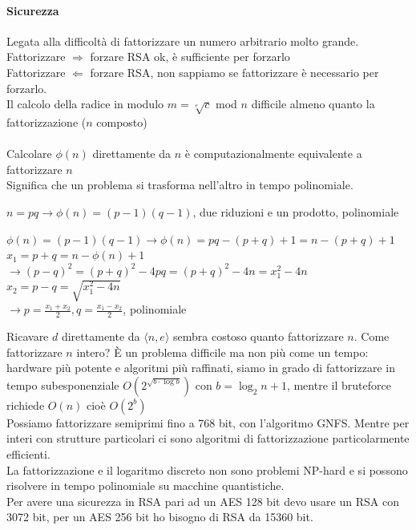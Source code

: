 \documentclass[10pt]{book}
\begin{document}
\paragraph{Sicurezza} Legata alla difficoltà di fattorizzare un numero arbitrario molto grande.\\
Fattorizzare $\Rightarrow$ forzare RSA ok, è sufficiente per forzarlo\\
Fattorizzare $\Leftarrow$ forzare RSA, non sappiamo se fattorizzare è necessario per forzarlo.\\
Il calcolo della radice in modulo $m = \sqrt[e]{c}$ mod $n$ difficile almeno quanto la fattorizzazione ($n$ composto)\\\\
Calcolare $\phi(n)$ direttamente da $n$ è computazionalmente equivalente a fattorizzare $n$\\Significa che un problema si trasforma nell'altro in tempo polinomiale.
\begin{list}{}{}
	\item $n = pq \longrightarrow \phi(n) = (p-1)(q-1)$, due riduzioni e un prodotto, polinomiale
	\item $\phi(n) = (p-1)(q-1) \rightarrow \phi(n) = pq - (p + q) + 1 = n - (p + q) + 1$\\$x_1 = p + q = n - \phi(n) + 1$\\
	$\rightarrow (p - q)^2 = (p + q)^2 - 4pq = (p+q)^2 -4n = x_1^2 - 4n$\\$x_2 = p - q = \sqrt{x_1^2 - 4n}$\\
	$\rightarrow p = \frac{x_1 + x_2}{2}, q = \frac{x_1 - x_2}{2}$, polinomiale
\end{list}
Ricavare $d$ direttamente da $\langle n, e\rangle$ sembra costoso quanto fattorizzare $n$. Come fattorizzare $n$ intero? È un problema difficile ma non più come un tempo: hardware più potente e algoritmi più raffinati, siamo in grado di fattorizzare in tempo subesponenziale $O(2^{\sqrt{b\cdot\log b}})$ con $b = \log_2 n + 1$, mentre il bruteforce richiede $O(n)$ cioè $O(2^b)$\\
Possiamo fattorizzare semiprimi fino a 768 bit, con l'algoritmo GNFS. Mentre per interi con strutture particolari ci sono algoritmi di fattorizzazione particolarmente efficienti.\\
La fattorizzazione e il logaritmo discreto non sono problemi NP-hard e si possono risolvere in tempo polinomiale su macchine quantistiche.\\
Per avere una sicurezza in RSA pari ad un AES 128 bit devo usare un RSA con 3072 bit, per un AES 256 bit ho bisogno di RSA da 15360 bit.\\\\
\end{document}
